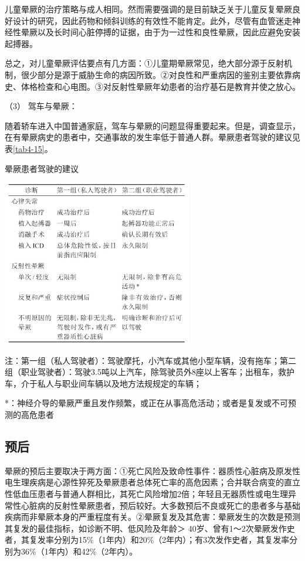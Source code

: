 儿童晕厥的治疗策略与成人相同。然而需要强调的是目前缺乏关于儿童反复晕厥良好设计的研究，因此药物和倾斜训练的有效性不能肯定。此外，尽管有血管迷走神经性晕厥以及长时间心脏停搏的证据，由于为一过性和良性晕厥，因此应避免安装起搏器。

总之，对儿童晕厥评估要点有几方面：①儿童期晕厥常见，绝大部分源于反射机制，很少部分是源于威胁生命的病因所致。②对良性和严重病因的鉴别主要依靠病史、体格检查和心电图。③对反射性晕厥年幼患者的治疗基石是教育并使之放心。

\hypertarget{text00014.htmlux5cux23CHP1-4-4-1-5-3}{}
（3） 驾车与晕厥：

随着轿车进入中国普通家庭，驾车与晕厥的问题显得重要起来。但是，调查显示，在有晕厥病史的患者中，交通事故的发生率低于普通人群。晕厥患者驾驶的建议见表\ref{tab4-15}。

\begin{table}[htbp]
\begin{center}
\caption{晕厥患者驾驶的建议}
\label{tab4-15}
\includegraphics[width=3.27083in,height=2.86458in]{./images/Image00033.jpg}
\end{center}

{\small
注：第一组（私人驾驶者）：驾驶摩托，小汽车或其他小型车辆，没有拖车；第二组（职业驾驶者）：驾驶3.5吨以上汽车，除驾驶员外8座以上客车；出租车，救护车，介于私人与职业间车辆以及地方法规规定的车辆；

*：神经介导的晕厥严重且发作频繁，或正在从事高危活动；或者是复发或不可预测的高危患者
}
\end{table}

\subsection{预后}

晕厥的预后主要取决于两方面：①死亡风险及致命性事件：器质性心脏病及原发性电生理疾病是心源性猝死及晕厥患者总体死亡率的高危因素；合并联合病变的直立性低血压患者与普通人群相比，其死亡风险增加2倍；年轻且无器质性或电生理异常性心脏病的反射性晕厥患者，预后较好。大多数预后不良或死亡的患者多与基础疾病而非晕厥本身的严重程度有关。②晕厥复发及其危害：晕厥发生的次数是预测其复发的最佳指标，如诊断不明、低风险及年龄＞
40岁、曾有1～2次晕厥发作史者，其复发率分别为15\%（1年内）和20\%（2年内）；有3次发作史者，其复发率分别为36\%（1年内）和42\%（2年内）。


